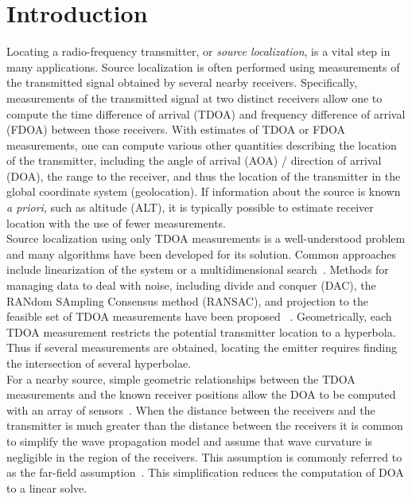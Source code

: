 \section{Introduction}
\label{s:intro}
Locating a radio-frequency transmitter, or \emph{source localization}, is a vital step in many applications. Source localization is often performed using measurements of the transmitted signal obtained by several nearby receivers. Specifically, measurements of the transmitted signal at two distinct receivers allow one to compute the time difference of arrival (TDOA) and frequency difference of arrival (FDOA) between those receivers. With estimates of TDOA or FDOA measurements, one can compute various other quantities describing the location of the transmitter, including the angle of arrival (AOA) / direction of arrival (DOA), the range to the receiver, and thus the location of the transmitter in the global coordinate system (geolocation). If information about the source is known {\em a priori}, such as altitude (ALT), it is typically possible to estimate receiver location with the use of fewer measurements.\\

Source localization using only TDOA measurements is a well-understood problem and many algorithms have been developed for its solution. Common approaches include linearization of the system or a multidimensional search~\cite{Torrieri1984}. Methods for managing data to deal with noise, including divide and conquer (DAC), the RANdom SAmpling Consensus method (RANSAC), and projection to the feasible set of TDOA measurements have been proposed ~\cite{Cameron,Abel1990,Li2009,Compagnoni2017}. Geometrically, each TDOA measurement restricts the potential transmitter location to a hyperbola. Thus if several measurements are obtained, locating the emitter requires finding the intersection of several hyperbolae. \\

For a nearby source, simple geometric relationships between the TDOA measurements and the known receiver positions allow the DOA to be computed with an array of sensors~\cite{Benesty2008}. When the distance between the receivers and the transmitter is much greater than the distance between the receivers it is common to simplify the wave propagation model and assume that wave curvature is negligible in the region of the receivers. This assumption is commonly referred to as the far-field assumption~\cite{Cheney2009}. This simplification reduces the computation of DOA to a linear solve. \\

